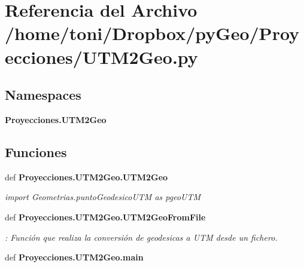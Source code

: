 \section{Referencia del Archivo /home/toni/\-Dropbox/py\-Geo/\-Proyecciones/\-U\-T\-M2\-Geo.py}
\label{Proyecciones_2UTM2Geo_8py}
\subsection*{Namespaces}
\begin{DoxyCompactItemize}
\item 
{\bf Proyecciones.\-U\-T\-M2\-Geo}
\end{DoxyCompactItemize}
\subsection*{Funciones}
\begin{DoxyCompactItemize}
\item 
def {\bf Proyecciones.\-U\-T\-M2\-Geo.\-U\-T\-M2\-Geo}
\begin{DoxyCompactList}\small\item\em import Geometrias.\-punto\-Geodesico\-U\-T\-M as pgeo\-U\-T\-M \end{DoxyCompactList}\item 
def {\bf Proyecciones.\-U\-T\-M2\-Geo.\-U\-T\-M2\-Geo\-From\-File}
\begin{DoxyCompactList}\small\item\em \-: Función que realiza la conversión de geodesicas a U\-T\-M desde un fichero. \end{DoxyCompactList}\item 
def {\bf Proyecciones.\-U\-T\-M2\-Geo.\-main}
\end{DoxyCompactItemize}
